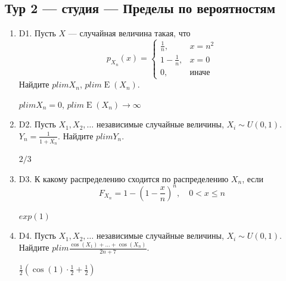 \documentclass[12pt]{article}
\DeclareMathOperator{\E}{E}
\newenvironment{problem}{}{}
\newenvironment{sol}{}{} %
\begin{document}
\newpage
\subsection{Тур 2 — студия — Пределы по вероятностям}

\begin{enumerate}
\begin{problem}
\item[D1.] Пусть $X$ — случайная величина такая, что
\[
p_{X_n}(x) = \begin{cases}
\frac{1}{n},  & x=n^2 \\
1 - \frac{1}{n}, & x=0 \\
0, & \text{иначе}
\end{cases}
\]
Найдите $plim X_n$, $plim \E(X_n)$.

\begin{sol}
$plim X_n = 0$, $plim \E(X_n) \to \infty$
\end{sol}
\end{problem}

\begin{problem}
\item[D2.] Пусть $X_1, X_2, \ldots $ независимые случайные величины, $X_i \sim U(0,1)$. $Y_n = \frac{1}{1 + \overline{X_n}}$. Найдите $plim Y_n$. 

\begin{sol}
$2/3$
\end{sol}
\end{problem}

\begin{problem}
\item[D3.] К какому распределению сходится по распределению $X_n$, если 
\[
F_{X_n} = 1 - \left(1 - \frac{x}{n}\right)^n, \quad 0 < x \leq n
\]

\begin{sol}
$exp(1)$
\end{sol}
\end{problem}

\begin{problem}
\item[D4.] Пусть $X_1, X_2, \ldots $ независимые случайные величины, $X_i \sim U(0,1)$. Найдите $plim \frac{\cos(X_1) + \ldots + \cos(X_n)}{2n+7}$. 

\begin{sol}
$\frac{1}{2} \left(\cos (1) \cdot \frac{1}{2} + \frac{1}{2} \right)$
\end{sol}
\end{problem}

\end{enumerate}
\end{document}

